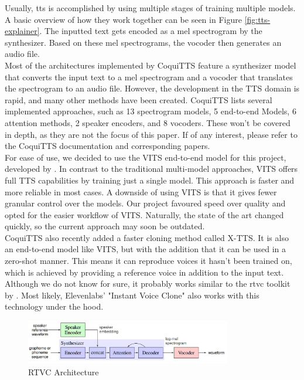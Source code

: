 \documentclass[
  a4paper,  %
  twoside,  %
  bibliography=totoc,
  headsepline,
  cleardoublepage=empty,
  parskip=half,
  draft=false
]{scrbook}
\begin{document}
Usually, \gls{tts} is accomplished by using multiple stages of training multiple models. A basic overview of how they work together can be seen in Figure \ref{fig:tts-explainer}. The inputted text gets encoded as a mel spectrogram by the synthesizer. Based on these mel spectrograms, the vocoder then generates an audio file. \\
Most of the architectures implemented by CoquiTTS feature a synthesizer model that converts the input text to a mel spectrogram and a vocoder that translates the spectrogram to an audio file. However, the development in the TTS domain is rapid, and many other methods have been created. 
CoquiTTS lists several implemented approaches, such as 13 spectrogram models, 5 end-to-end Models, 6 attention methods, 2 speaker encoders, and 8 vocoders. These won't be covered in depth, as they are not the focus of this paper. If of any interest, please refer to the CoquiTTS documentation and corresponding papers.\\
For ease of use, we decided to use the VITS end-to-end model for this project, developed by \citet{kimConditionalVariationalAutoencoder2021}. In contrast to the traditional multi-model approaches, VITS offers full TTS capabilities by training just a single model. This approach is faster and more reliable in most cases. A downside of using VITS is that it gives fewer granular control over the models. Our project favoured speed over quality and opted for the easier workflow of VITS. Naturally, the state of the art changed quickly, so the current approach may soon be outdated. \\
CoquiTTS also recently added a faster cloning method called X-TTS. It is also an end-to-end model like VITS, but with the addition that it can be used in a zero-shot manner. This means it can reproduce voices it hasn't been trained on, which is achieved by providing a reference voice in addition to the input text. Although we do not know for sure, it probably works similar to the \gls{rtvc} toolkit by \citeauthor{jemineRealTimeVoiceCloning2019}. Most likely, Elevenlabs' "Instant Voice Clone" also works with this technology under the hood.
\begin{figure}[h]
  \centering
  \includegraphics[width=0.8\textwidth]{./graphics/images/rtvc.png}
  \caption{RTVC Architecture \cite{jemineRealTimeVoiceCloning2019}}
  \label{fig:rtvc-arch}
\end{figure}
\end{document}
